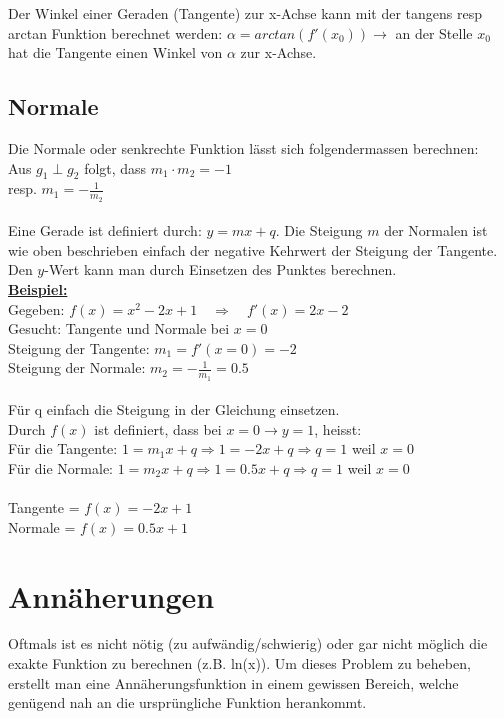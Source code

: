 \documentclass[12pt]{scrartcl}
\begin{document}
\noindent
Der Winkel einer Geraden (Tangente) zur x-Achse kann mit der tangens resp arctan 
Funktion berechnet werden: $\alpha = arctan(f'(x_0)) \rightarrow$ an der Stelle 
$x_0$ hat die Tangente einen Winkel von $\alpha$ zur x-Achse.


\subsection{Normale}
Die Normale oder senkrechte Funktion lässt sich folgendermassen berechnen:\\
Aus  $g_1 \perp g_2  $ folgt, dass $m_1 \cdot m_2 = -1$ \\ 
resp. $m_1 = -\frac{1}{m_2}$ \\
\\ 
\noindent
Eine Gerade ist definiert durch: $y = mx + q$. Die Steigung $m$ der Normalen ist wie oben
beschrieben einfach der negative Kehrwert der Steigung der Tangente. Den $y$-Wert 
kann man durch Einsetzen des Punktes berechnen. \\

\noindent
\underline{\textbf{Beispiel:}} \\
Gegeben: $f(x) = x^2 -2x + 1 \quad \Rightarrow \quad f'(x) = 2x -2$\\
Gesucht: Tangente und Normale bei $x=0$\\
Steigung der Tangente: $m_1 = f'(x=0) = -2$ \\
Steigung der Normale: $m_2 = -\frac{1}{m_1} = 0.5$ \\
\\
Für q einfach die Steigung in der Gleichung einsetzen.\\
Durch $f(x)$ ist definiert, dass bei $x=0 \rightarrow y=1$, heisst:\\
Für die Tangente: $1 = m_1x + q \Rightarrow 1= -2x + q \Rightarrow q = 1$ weil $x=0$\\
Für die Normale: $1 = m_2x + q \Rightarrow 1= 0.5x + q \Rightarrow q = 1$ weil $x=0$\\
\\
\noindent
Tangente = \underline{$f(x) = -2x + 1$}\\
Normale = \underline{$f(x) = 0.5x + 1$}\\

\section{Annäherungen} \label{approximation}
Oftmals ist es nicht nötig (zu aufwändig/schwierig) oder gar nicht möglich die exakte 
Funktion zu berechnen (z.B. ln(x)). Um dieses Problem zu beheben, erstellt man eine Annäherungsfunktion
in einem gewissen Bereich, welche genügend nah an die ursprüngliche Funktion herankommt.
\end{document}

